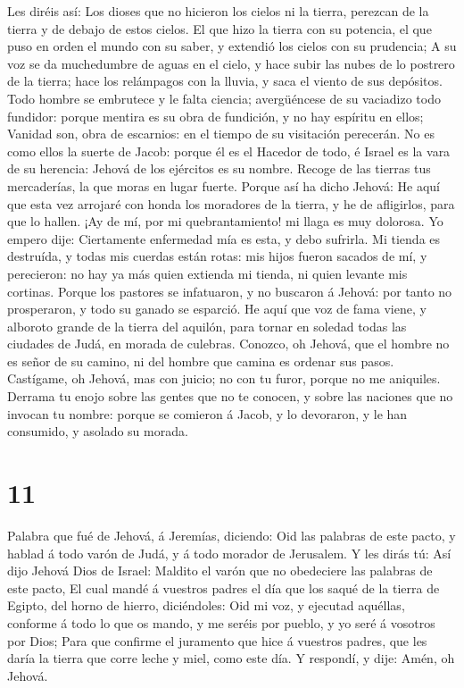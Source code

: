  Les diréis así: Los dioses que no hicieron los cielos ni
la tierra, perezcan de la tierra y de debajo de estos cielos.
 El que hizo la tierra con su potencia, el que puso en
orden el mundo con su saber, y extendió los cielos con su prudencia;
 A su voz se da muchedumbre de aguas en el cielo, y hace
subir las nubes de lo postrero de la tierra; hace los relámpagos con la
lluvia, y saca el viento de sus depósitos.  Todo hombre se
embrutece y le falta ciencia; avergüéncese de su vaciadizo todo
fundidor: porque mentira es su obra de fundición, y no hay espíritu en
ellos;  Vanidad son, obra de escarnios: en el tiempo de su
visitación perecerán.  No es como ellos la suerte de Jacob:
porque él es el Hacedor de todo, é Israel es la vara de su herencia:
Jehová de los ejércitos es su nombre.  Recoge de las
tierras tus mercaderías, la que moras en lugar fuerte. 
Porque así ha dicho Jehová: He aquí que esta vez arrojaré con honda los
moradores de la tierra, y he de afligirlos, para que lo hallen.
 ¡Ay de mí, por mi quebrantamiento! mi llaga es muy
dolorosa. Yo empero dije: Ciertamente enfermedad mía es esta, y debo
sufrirla.  Mi tienda es destruída, y todas mis cuerdas
están rotas: mis hijos fueron sacados de mí, y perecieron: no hay ya más
quien extienda mi tienda, ni quien levante mis cortinas. 
Porque los pastores se infatuaron, y no buscaron á Jehová: por tanto no
prosperaron, y todo su ganado se esparció.  He aquí que voz
de fama viene, y alboroto grande de la tierra del aquilón, para tornar
en soledad todas las ciudades de Judá, en morada de culebras.
 Conozco, oh Jehová, que el hombre no es señor de su
camino, ni del hombre que camina es ordenar sus pasos. 
Castígame, oh Jehová, mas con juicio; no con tu furor, porque no me
aniquiles.  Derrama tu enojo sobre las gentes que no te
conocen, y sobre las naciones que no invocan tu nombre: porque se
comieron á Jacob, y lo devoraron, y le han consumido, y asolado su
morada.

\hypertarget{section-10}{%
\section{11}\label{section-10}}

 Palabra que fué de Jehová, á Jeremías, diciendo:
 Oid las palabras de este pacto, y hablad á todo varón de
Judá, y á todo morador de Jerusalem.  Y les dirás tú: Así
dijo Jehová Dios de Israel: Maldito el varón que no obedeciere las
palabras de este pacto,  El cual mandé á vuestros padres el
día que los saqué de la tierra de Egipto, del horno de hierro,
diciéndoles: Oid mi voz, y ejecutad aquéllas, conforme á todo lo que os
mando, y me seréis por pueblo, y yo seré á vosotros por Dios;
 Para que confirme el juramento que hice á vuestros padres,
que les daría la tierra que corre leche y miel, como este día. Y
respondí, y dije: Amén, oh Jehová.

